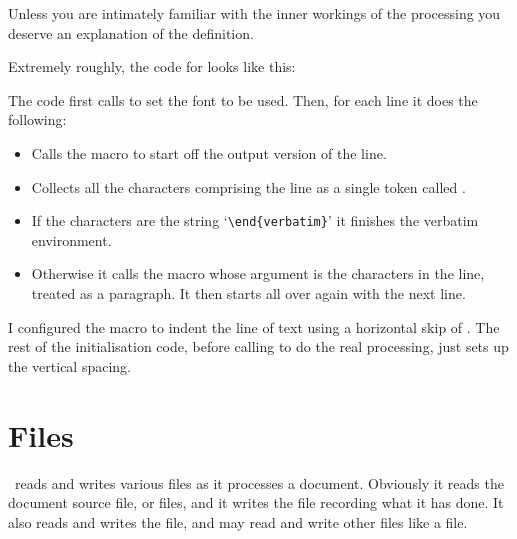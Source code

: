 {{{{    Unless you are intimately familiar with the inner workings of the
 processing you deserve an explanation of the 
definition.

    Extremely roughly, the code for \cmd{\verbatim} looks like this:
\begin{lcode}
\def\verbatim{%
  \verbatim@font
  % for each line, until \end{verbatim}
    \verbatim@startline 
    \verbatim@processline{\the\verbatim@line\par}
}
\end{lcode}
The code first calls \cmd{\verbatim@font} to set the font to be used.
Then, for each line it does the following:
\begin{itemize}
\item Calls the macro \cmd{\verbatim@startline} to start
      off the output version of the line.
\item Collects all the characters comprising the line 
      as a single token called \cmd{\verbatim@line}.
\item If the characters are the string `\verb?\end{verbatim}?' it finishes
      the verbatim environment.
\item Otherwise it calls the macro \cmd{\verbatim@processline} whose 
      argument is the characters in the 
      line, treated as a paragraph. It then starts all over again with
      the next line.
\end{itemize}

    I configured the \cmd{\verbatim@startline}
macro to indent the line of text using a horizontal skip of \lnc{\gparindent}.
The rest of the initialisation code, before calling \cmd{\verbatim}
to do the real processing, just sets up the vertical spacing. 







\section{Files}


    \ltx\ reads and writes various files as it processes a document.
Obviously it reads the document source file, or files, and it writes
the  file recording what it has done. It also reads and writes
the  file, and may read and write other files like a 
 file. 

}}}}
